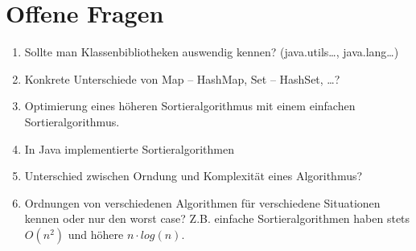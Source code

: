 \newpage
\section{Offene Fragen}

\begin{enumerate}
	\item Sollte man Klassenbibliotheken auswendig kennen? 
		(java.utils\dots, java.lang\dots)
	\item Konkrete Unterschiede von Map -- HashMap, Set -- HashSet, 
		\dots ?
	\item Optimierung eines höheren Sortieralgorithmus mit einem 
		einfachen Sortieralgorithmus. 
	\item In Java implementierte Sortieralgorithmen
	\item Unterschied zwischen Orndung und Komplexität eines 
		Algorithmus? 
	\item Ordnungen von verschiedenen Algorithmen für verschiedene 
		Situationen kennen oder nur den worst case? Z.B. einfache 
		Sortieralgorithmen haben stets $O(n^2)$ und höhere $n 
		\cdot log(n)$.
\end{enumerate}
